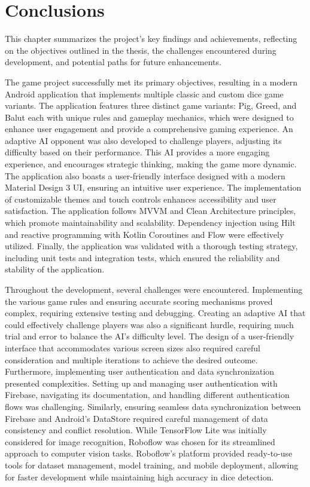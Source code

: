 
\chapter{Conclusions}
\label{chap:conclusions}

This chapter summarizes the project's key findings and achievements, reflecting on the objectives outlined in the thesis, the challenges encountered during development, and potential paths for future enhancements.

The game project successfully met its primary objectives, resulting in a modern Android application that implements multiple classic and custom dice game variants. The application features three distinct game variants: Pig, Greed, and Balut each with unique rules and gameplay mechanics, which were designed to enhance user engagement and provide a comprehensive gaming experience. An adaptive AI opponent was also developed to challenge players, adjusting its difficulty based on their performance. This AI provides a more engaging experience, and encourages strategic thinking, making the game more dynamic. The application also boasts a user-friendly interface designed with a modern Material Design 3 UI, ensuring an intuitive user experience. The implementation of customizable themes and touch controls enhances accessibility and user satisfaction. The application follows MVVM and Clean Architecture principles, which promote maintainability and scalability.  Dependency injection using Hilt and reactive programming with Kotlin Coroutines and Flow were effectively utilized. Finally, the application was validated with a thorough testing strategy, including unit tests and integration tests, which ensured the reliability and stability of the application.

Throughout the development, several challenges were encountered. Implementing the various game rules and ensuring accurate scoring mechanisms proved complex, requiring extensive testing and debugging. Creating an adaptive AI that could effectively challenge players was also a significant hurdle, requiring much trial and error to balance the AI’s difficulty level. The design of a user-friendly interface that accommodates various screen sizes also required careful consideration and multiple iterations to achieve the desired outcome. Furthermore, implementing user authentication and data synchronization presented complexities. Setting up and managing user authentication with Firebase, navigating its documentation, and handling different authentication flows was challenging. Similarly, ensuring seamless data synchronization between Firebase and Android's DataStore required careful management of data consistency and conflict resolution. While TensorFlow Lite was initially considered for image recognition, Roboflow was chosen for its streamlined approach to computer vision tasks. Roboflow's platform provided ready-to-use tools for dataset management, model training, and mobile deployment, allowing for faster development while maintaining high accuracy in dice detection.

